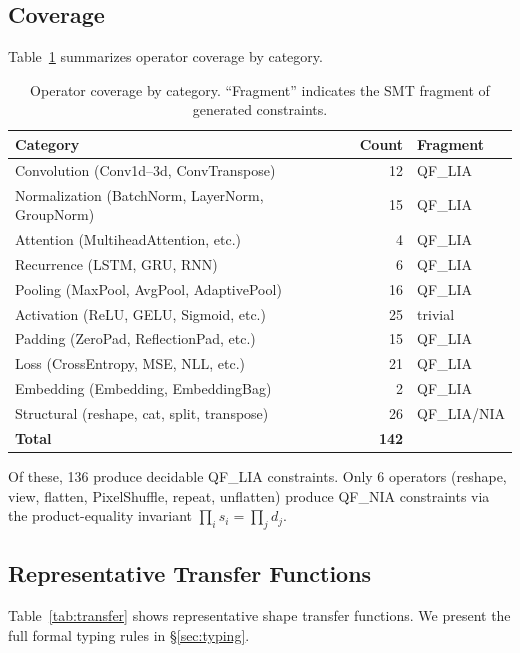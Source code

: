 \documentclass[10pt]{article}
\theoremstyle{plain}
\theoremstyle{definition}
\theoremstyle{remark}
\begin{document}
\subsection{Coverage}

Table~\ref{tab:coverage} summarizes operator coverage by category.

\begin{table}[t]
\centering
\caption{Operator coverage by category.  ``Fragment'' indicates the
  SMT fragment of generated constraints.}
\label{tab:coverage}
\small
\begin{tabular}{@{}lrl@{}}
\toprule
\textbf{Category} & \textbf{Count} & \textbf{Fragment} \\
\midrule
Convolution (Conv1d--3d, ConvTranspose) & 12 & QF\_LIA \\
Normalization (BatchNorm, LayerNorm, GroupNorm) & 15 & QF\_LIA \\
Attention (MultiheadAttention, etc.) & 4 & QF\_LIA \\
Recurrence (LSTM, GRU, RNN) & 6 & QF\_LIA \\
Pooling (MaxPool, AvgPool, AdaptivePool) & 16 & QF\_LIA \\
Activation (ReLU, GELU, Sigmoid, etc.) & 25 & trivial \\
Padding (ZeroPad, ReflectionPad, etc.) & 15 & QF\_LIA \\
Loss (CrossEntropy, MSE, NLL, etc.) & 21 & QF\_LIA \\
Embedding (Embedding, EmbeddingBag) & 2 & QF\_LIA \\
Structural (reshape, cat, split, transpose) & 26 & QF\_LIA/NIA \\
\midrule
\textbf{Total} & \textbf{142} & \\
\bottomrule
\end{tabular}
\end{table}

Of these, 136 produce decidable QF\_LIA constraints.  Only 6
operators (reshape, view, flatten, PixelShuffle, repeat, unflatten)
produce QF\_NIA constraints via the product-equality invariant
$\prod_i s_i = \prod_j d_j$.

\subsection{Representative Transfer Functions}

Table~\ref{tab:transfer} shows representative shape transfer
functions.  We present the full formal typing rules in
\S\ref{sec:typing}.
\end{document}
